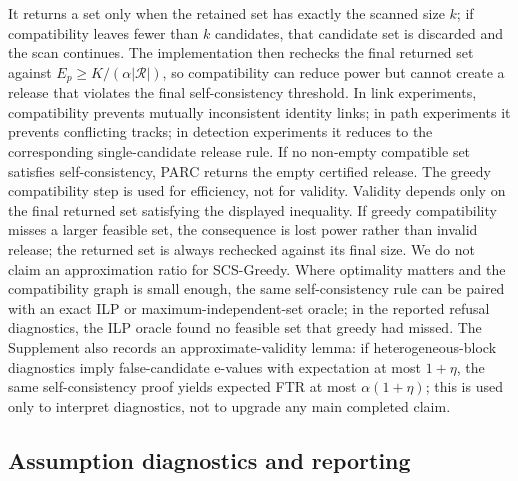 \documentclass[10pt,twocolumn]{article}
\newcommand{\Rcal}{\mathcal R}
\begin{document}
It returns a set only when the retained set has exactly the scanned size \(k\); if compatibility leaves fewer than \(k\) candidates, that candidate set is discarded and the scan continues.
The implementation then rechecks the final returned set against \(E_p\ge K/(\alpha|\Rcal|)\), so compatibility can reduce power but cannot create a release that violates the final self-consistency threshold.
In link experiments, compatibility prevents mutually inconsistent identity links; in path experiments it prevents conflicting tracks; in detection experiments it reduces to the corresponding single-candidate release rule.
If no non-empty compatible set satisfies self-consistency, PARC returns the empty certified release.
The greedy compatibility step is used for efficiency, not for validity.
Validity depends only on the final returned set satisfying the displayed inequality.
If greedy compatibility misses a larger feasible set, the consequence is lost power rather than invalid release; the returned set is always rechecked against its final size.
We do not claim an approximation ratio for SCS-Greedy.
Where optimality matters and the compatibility graph is small enough, the same self-consistency rule can be paired with an exact ILP or maximum-independent-set oracle; in the reported refusal diagnostics, the ILP oracle found no feasible set that greedy had missed.
The Supplement also records an approximate-validity lemma: if heterogeneous-block diagnostics imply false-candidate e-values with expectation at most \(1+\eta\), the same self-consistency proof yields expected FTR at most \(\alpha(1+\eta)\); this is used only to interpret diagnostics, not to upgrade any main completed claim.

\subsection{Assumption diagnostics and reporting}
\end{document}
